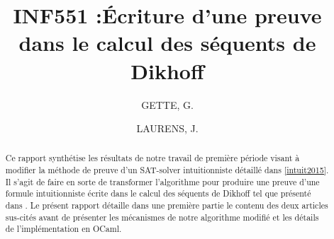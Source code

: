 \documentclass[10pt, a4paper]{amsart}
\title{INF551 :\'Ecriture d'une preuve dans le calcul des s\'equents de Dikhoff
}
\author{GETTE, G. \and LAURENS, J.}
\begin{document}
\begin{abstract}
  Ce rapport synth\'etise les résultats de notre travail de premi\`ere p\'eriode visant à modifier la méthode de preuve d'un SAT-solver intuitionniste détaillé dans \ref{intuit2015}. Il s'agit de faire en sorte de transformer l'algorithme pour produire une preuve d'une formule intuitionniste écrite dans le calcul des séquents de Dikhoff tel que pr\'esent\'e dans \cite{dikh}.
Le présent rapport d\'etaille dans une premi\`ere partie le contenu des deux articles sus-cit\'es avant de pr\'esenter les mécanismes de notre algorithme modifi\'e et les d\'etails de l'impl\'ementation en OCaml.
\end{abstract}

\maketitle
\tableofcontents
\newpage







\end{document}
